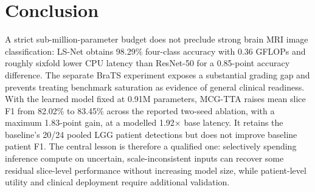 \section{Conclusion}
A strict sub-million-parameter budget does not preclude strong brain MRI image classification: LS-Net obtains 98.29\% four-class accuracy with 0.36 GFLOPs and roughly sixfold lower CPU latency than ResNet-50 for a 0.85-point accuracy difference. The separate BraTS experiment exposes a substantial grading gap and prevents treating benchmark saturation as evidence of general clinical readiness. With the learned model fixed at 0.91M parameters, MCG-TTA raises mean slice F1 from 82.02\% to 83.45\% across the reported two-seed ablation, with a maximum 1.83-point gain, at a modelled 1.92$\times$ base latency. It retains the baseline's 20/24 pooled LGG patient detections but does not improve baseline patient F1. The central lesson is therefore a qualified one: selectively spending inference compute on uncertain, scale-inconsistent inputs can recover some residual slice-level performance without increasing model size, while patient-level utility and clinical deployment require additional validation.
